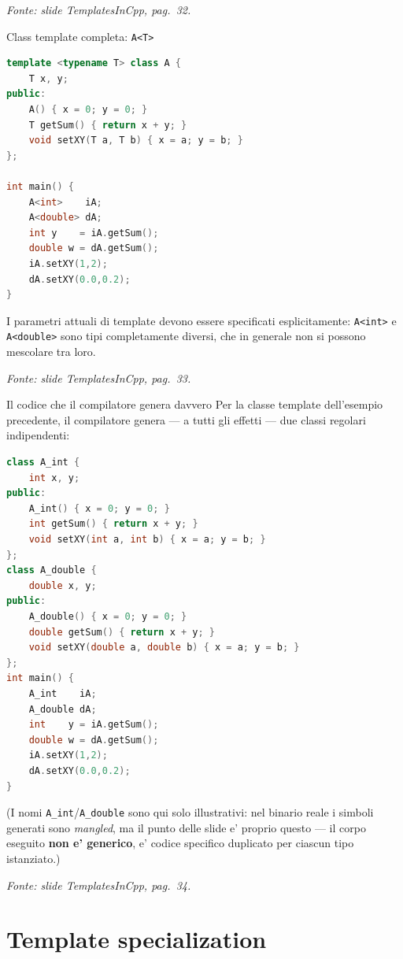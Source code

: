\documentclass{report}
\newcommand{\code}[1]{\texttt{\small #1}}
\newcommand{\fonteslide}[1]{{\footnotesize\itshape\color{gray} Fonte: slide \emph{TemplatesInCpp}, pag.~#1.\par}}
\begin{document}
\fonteslide{32}

\begin{Example}{Class template completa: \code{A<T>}}{}
\begin{lstlisting}[language=C++]
template <typename T> class A {
    T x, y;
public:
    A() { x = 0; y = 0; }
    T getSum() { return x + y; }
    void setXY(T a, T b) { x = a; y = b; }
};

int main() {
    A<int>    iA;
    A<double> dA;
    int y    = iA.getSum();
    double w = dA.getSum();
    iA.setXY(1,2);
    dA.setXY(0.0,0.2);
}
\end{lstlisting}
I parametri attuali di template devono essere specificati esplicitamente:
\code{A<int>} e \code{A<double>} sono tipi completamente diversi, che in
generale non si possono mescolare tra loro.
\end{Example}

\fonteslide{33}

\begin{Example}{Il codice che il compilatore genera davvero}{}
Per la classe template dell'esempio precedente, il compilatore genera --- a
tutti gli effetti --- due classi regolari indipendenti:
\begin{lstlisting}[language=C++]
class A_int {
    int x, y;
public:
    A_int() { x = 0; y = 0; }
    int getSum() { return x + y; }
    void setXY(int a, int b) { x = a; y = b; }
};
class A_double {
    double x, y;
public:
    A_double() { x = 0; y = 0; }
    double getSum() { return x + y; }
    void setXY(double a, double b) { x = a; y = b; }
};
int main() {
    A_int    iA;
    A_double dA;
    int    y = iA.getSum();
    double w = dA.getSum();
    iA.setXY(1,2);
    dA.setXY(0.0,0.2);
}
\end{lstlisting}
(I nomi \code{A\_int}/\code{A\_double} sono qui solo illustrativi: nel
binario reale i simboli generati sono \emph{mangled}, ma il punto delle
slide e' proprio questo --- il corpo eseguito \textbf{non e' generico}, e'
codice specifico duplicato per ciascun tipo istanziato.)
\end{Example}

\fonteslide{34}

\chapter{Template specialization}\label{ch:specialization}
\end{document}
